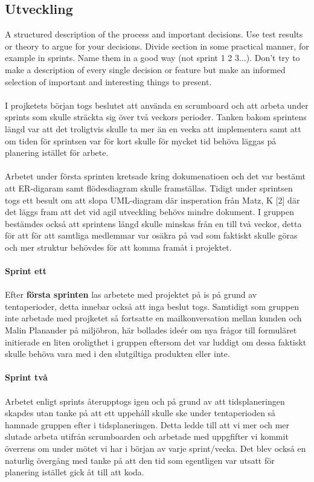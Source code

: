\documentclass[12pt]{article}
\begin{document}
\subsection{Utveckling}
A structured description of the process and important decisions. Use test results or theory to argue for your decisions. Divide section in some practical manner, for example in sprints. Name them in a good way (not sprint 1 2 3...). Don’t try to make a description of every single decision or feature but make an informed selection of important and interesting things to present.\\\\
I projketets början togs beslutet att använda en scrumboard och att arbeta under sprints som skulle sträckta sig över två veckors perioder. Tanken bakom sprintens längd var att det troligtvis skulle ta mer än en vecka att implementera samt att om tiden för sprintsen var för kort skulle för mycket tid behöva läggas på planering istället för arbete.\\\\
Arbetet under första sprinten kretsade kring dokumenatioen och det var bestämt att ER-digaram samt flödesdiagram skulle framställas. Tidigt under sprintsen togs ett besult om att slopa UML-diagram där insperation från Matz, K [2] där det läggs fram att det vid agil utveckling behövs mindre dokument. 
I gruppen bestämdes också att sprintens längd skulle minskas från en till två veckor, detta för att för att samtliga medlemmar var osäkra på vad som faktiskt skulle göras och mer struktur behövdes för att komma framåt i projektet. \\\\
\textbf{Sprint ett}\\\\
Efter \textbf{första sprinten} las arbetete med projektet på is på grund av tentaperioder, detta innebar också att inga beslut togs. Samtidigt som gruppen inte arbetade med projketet så fortsatte en mailkonversation mellan kunden och Malin Planander på miljöbron, här bollades ideér om nya frågor till formuläret initierade en liten oroligthet i gruppen eftersom det var luddigt om dessa faktiskt skulle behöva vara med i den slutgiltiga produkten eller inte.\\\\
\textbf{Sprint två}\\\\
Arbetet enligt sprints återupptogs igen och på grund av att tidsplaneringen skapdes utan tanke på att ett uppehåll skulle ske under tentaperioden så hamnade gruppen efter i tidsplaneringen. Detta ledde till att vi mer och mer slutade arbeta utifrån scrumboarden och arbetade med uppgfifter vi kommit överrens om under mötet vi har i början av varje sprint/vecka. Det blev också en naturlig övergång med tanke på att den tid som egentligen var utsatt för planering istället gick åt till att koda. \\\\
\end{document}
